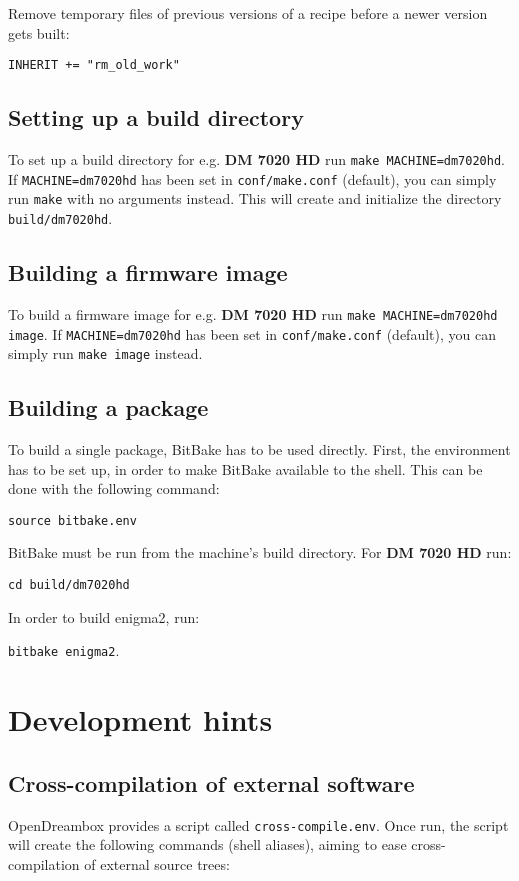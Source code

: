 \documentclass[a4paper]{article}
\newcommand{\shell}[1]{\texttt{\small #1}}
\begin{document}
       Remove temporary files of previous versions of a recipe before a newer version gets built:

       \shell{INHERIT += "rm\_old\_work"}

  \subsection{Setting up a build directory}
     To set up a build directory for e.g. \textbf{DM 7020 HD} run \shell{make MACHINE=dm7020hd}. If
     \shell{MACHINE=dm7020hd} has been set in \shell{conf/make.conf} (default), you can simply run \shell{make}
     with no arguments instead. This will create and initialize the directory \shell{build/dm7020hd}.

  \subsection{Building a firmware image}
     To build a firmware image for e.g. \textbf{DM 7020 HD} run \shell{make MACHINE=dm7020hd image}.
     If \shell{MACHINE=dm7020hd} has been set in \shell{conf/make.conf} (default), you can simply run
     \shell{make image} instead.

  \subsection{Building a package}
     To build a single package, BitBake has to be used directly. First, the environment
     has to be set up, in order to make BitBake available to the shell. This can be done
     with the following command:

     \shell{source bitbake.env}

     BitBake must be run from the machine's build directory. For \textbf{DM 7020 HD} run:

     \shell{cd build/dm7020hd}

     In order to build enigma2, run:

     \shell{bitbake enigma2}.

\section{Development hints}

  \subsection{Cross-compilation of external software}
    OpenDreambox provides a script called \shell{cross-compile.env}. Once run, the script will create
    the following commands (shell aliases), aiming to ease cross-compilation of external source trees:
\end{document}
